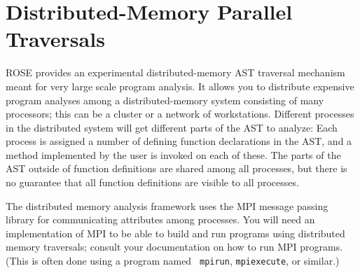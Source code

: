  
\chapter{Distributed-Memory Parallel Traversals}
\label{chap:distributedMemoryTraversals}
 
    ROSE provides an experimental distributed-memory AST traversal mechanism meant for very large scale program
analysis. It allows you to distribute expensive program analyses among a distributed-memory system consisting of many
processors; this can be a cluster or a network of workstations. Different processes in the distributed system will get
different parts of the AST to analyze: Each process is assigned a number of defining function declarations in the AST,
and a method implemented by the user is invoked on each of these. The parts of the AST outside of function definitions
are shared among all processes, but there is no guarantee that all function definitions are visible to all processes.

    The distributed memory analysis framework uses the MPI message passing library for communicating attributes among
processes. You will need an implementation of MPI to be able to build and run programs using distributed memory
traversals; consult your documentation on how to run MPI programs. (This is often done using a program named {\tt
mpirun}, {\tt mpiexecute}, or similar.)

